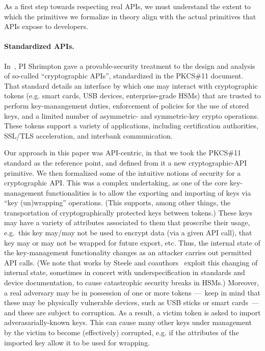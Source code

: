 \begin{task}
  As a first step towards respecting real APIs, we must understand the extent to
  which the primitives we formalize in theory align with the actual primitives
  that APIs expose to developers. 
\end{task}

\paragraph{Standardized APIs. }
%
In~\cite{SSW}, PI Shrimpton gave a provable-security treatment to the design and
analysis of so-called ``cryptographic APIs'', standardized in the PKCS\#11
document\cite{xxx}.  That standard details an interface by which one may
interact with cryptographic tokens (e.g. smart cards, USB devices,
enterprise-grade HSMs) that are trusted to perform key-manangement duties,
enforcement of policies for the use of stored keys, and a limited number of
asymmetric- and symmetric-key crypto operations.  These tokens support a variety
of applications, including certification authorities, SSL/TLS acceleration, and
interbank communication.
%

Our approach in this paper was API-centric, in that we took the PKCS\#11
standard as the reference point, and defined from it a new cryptographic-API
primitive.
%
%
We then formalized some of the intuitive notions of security for a
cryptographic API.  This was a complex undertaking, as one of the core
key-management functionalities is to allow the exporting and importing of keys
via ``key (un)wrapping'' operations.  (This supports, among other things, the
transportation of cryptographically protected keys between tokens.)  These keys
may have a variety of attributes associated to them that proscribe their usage,
e.g.\ this key may/may not be used to encrypt data (via a given API call), that
key may or may not be wrapped for future export, etc.  Thus, the internal state of
the key-management functionality changes as an attacker carries out permitted
API calls. (We note that works by Steele and coauthors~\cite{xxx,yyy,zzz}
exploit this changing of internal state, sometimes in concert with
underspecification in standards and device documentation, to cause catastrophic
security breaks in HSMs.) Moreover, a real adversary may be in possession of one
or more tokens ---~keep in mind that these may be physically vulnerable devices,
such as USB sticks or smart cards~--- and these are subject to corruption.  As a
result, a victim token is asked to import adverasarially-known keys.  This can
cause many other keys under management by the victim to become (effectively)
corrupted, e.g. if the attributes of the imported key allow it to be used for
wrapping.
%

